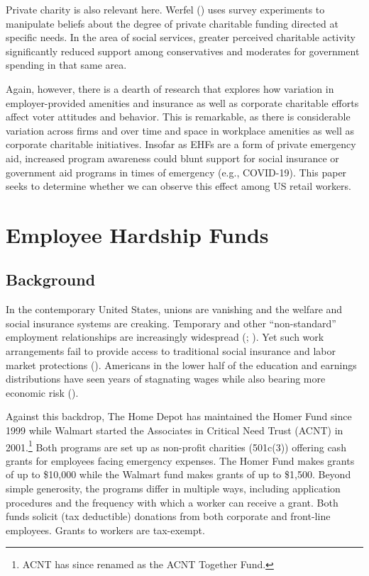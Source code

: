 \documentclass[
  11pt,
  oneside]{article}
\begin{document}
Private charity is also relevant here. Werfel () uses survey experiments to manipulate beliefs about the degree of private charitable funding directed at specific needs. In the area of social services, greater perceived charitable activity significantly reduced support among conservatives and moderates for government spending in that same area.

Again, however, there is a dearth of research that explores how variation in employer-provided amenities and insurance as well as corporate charitable efforts affect voter attitudes and behavior. This is remarkable, as there is considerable variation across firms and over time and space in workplace amenities as well as corporate charitable initiatives. Insofar as EHFs are a form of private emergency aid, increased program awareness could blunt support for social insurance or government aid programs in times of emergency (e.g., COVID-19). This paper seeks to determine whether we can observe this effect among US retail workers.

\section{Employee Hardship Funds}\label{sec-ehf-bkgrnd}

\subsection{Background}\label{background}

In the contemporary United States, unions are vanishing and the welfare and social insurance systems are creaking. Temporary and other ``non-standard'' employment relationships are increasingly widespread (; ). Yet such work arrangements fail to provide access to traditional social insurance and labor market protections (). Americans in the lower half of the education and earnings distributions have seen years of stagnating wages while also bearing more economic risk ().

Against this backdrop, The Home Depot has maintained the Homer Fund since 1999 while Walmart started the Associates in Critical Need Trust (ACNT) in 2001.\footnote{ACNT has since renamed as the ACNT Together Fund.} Both programs are set up as non-profit charities (501c(3)) offering cash grants for employees facing emergency expenses. The Homer Fund makes grants of up to \$10,000 while the Walmart fund makes grants of up to \$1,500. Beyond simple generosity, the programs differ in multiple ways, including application procedures and the frequency with which a worker can receive a grant. Both funds solicit (tax deductible) donations from both corporate and front-line employees. Grants to workers are tax-exempt.
\end{document}
